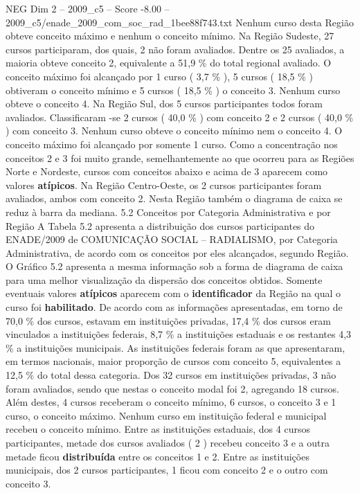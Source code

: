 \begin{textsample}{NEG Dim 2 – 2009\_c5 – Score -8.00 – 2009\_c5/enade\_2009\_com\_soc\_rad\_1bee88f743.txt}
Nenhum curso desta Região obteve conceito máximo e nenhum o conceito mínimo.
Na Região Sudeste, 27 cursos participaram, dos quais, 2 não foram avaliados.
Dentre os 25 avaliados, a maioria obteve conceito 2, equivalente a 51,9 \% do total regional avaliado.
O conceito máximo foi alcançado por 1 curso ( 3,7 \% ), 5 cursos ( 18,5 \% ) obtiveram o conceito mínimo e 5 cursos ( 18,5 \% ) o conceito 3.
Nenhum curso obteve o conceito 4.
Na Região Sul, dos 5 cursos participantes todos foram avaliados.
Classificaram -se 2 cursos ( 40,0 \% ) com conceito 2 e 2 cursos ( 40,0 \% ) com conceito 3.
Nenhum curso obteve o conceito mínimo nem o conceito 4.
O conceito máximo foi alcançado por somente 1 curso.
Como a concentração nos conceitos 2 e 3 foi muito grande, semelhantemente ao que ocorreu para as Regiões Norte e Nordeste, cursos com conceitos abaixo e acima de 3 aparecem como valores \textbf{atípicos}.
Na Região Centro-Oeste, os 2 cursos participantes foram avaliados, ambos com conceito 2.
Nesta Região também o diagrama de caixa se reduz à barra da mediana. 5.2 Conceitos por Categoria Administrativa e por Região A Tabela 5.2 apresenta a distribuição dos cursos participantes do ENADE/2009 de COMUNICAÇÃO SOCIAL – RADIALISMO, por Categoria Administrativa, de acordo com os conceitos por eles alcançados, segundo Região.
O Gráfico 5.2 apresenta a mesma informação sob a forma de diagrama de caixa para uma melhor visualização da dispersão dos conceitos obtidos.
Somente eventuais valores \textbf{atípicos} aparecem com o \textbf{identificador} da Região na qual o curso foi \textbf{habilitado}.
De acordo com as informações apresentadas, em torno de 70,0 \% dos cursos, estavam em instituições privadas, 17,4 \% dos cursos eram vinculados a instituições federais, 8,7 \% a instituições estaduais e os restantes 4,3 \% a instituições municipais.
As instituições federais foram as que apresentaram, em termos nacionais, maior proporção de cursos com conceito 5, equivalentes a 12,5 \% do total dessa categoria.
Dos 32 cursos em instituições privadas, 3 não foram avaliados, sendo que nestas o conceito modal foi 2, agregando 18 cursos.
Além destes, 4 cursos receberam o conceito mínimo, 6 cursos, o conceito 3 e 1 curso, o conceito máximo.
Nenhum curso em instituição federal e municipal recebeu o conceito mínimo.
Entre as instituições estaduais, dos 4 cursos participantes, metade dos cursos avaliados ( 2 ) recebeu conceito 3 e a outra metade ficou \textbf{distribuída} entre os conceitos 1 e 2.
Entre as instituições municipais, dos 2 cursos participantes, 1 ficou com conceito 2 e o outro com conceito 3.

\end{textsample}
